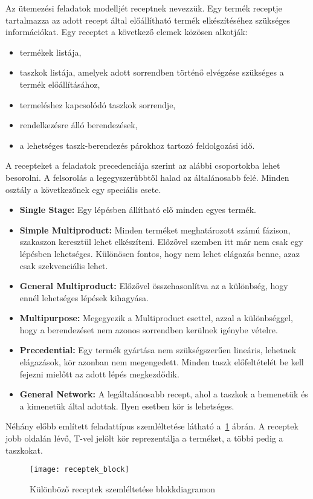 Az ütemezési feladatok modelljét receptnek nevezzük. Egy termék receptje tartalmazza az adott recept által előállítható termék elkészítéséhez szükséges információkat\cite{Hegyhati}. Egy receptet a következő elemek közösen alkotják:
\begin{itemize}
  \item termékek listája,
  \item taszkok listája, amelyek adott sorrendben történő elvégzése szükséges a termék előállításához,
  \item termeléshez kapcsolódó taszkok sorrendje,
  \item rendelkezésre álló berendezések,
  \item a lehetséges taszk-berendezés párokhoz tartozó feldolgozási idő.
\end{itemize}
A recepteket a feladatok precedenciája szerint az alábbi csoportokba lehet besorolni. A felsorolás a legegyszerűbbtől halad az általánosabb felé. Minden osztály a következőnek egy speciális esete.
\begin{itemize}
	\item \textbf{Single Stage:} Egy lépésben állítható elő minden egyes termék.
	\item \textbf{Simple Multiproduct:} Minden terméket meghatározott számú fázison, szakaszon keresztül lehet elkészíteni. Előzővel szemben itt már nem csak egy lépésben lehetséges. Különösen fontos, hogy nem lehet elágazás benne, azaz csak szekvenciális lehet.
	\item \textbf{General Multiproduct:} Előzővel összehasonlítva az a különbség, hogy ennél lehetséges lépések kihagyása.
	\item \textbf{Multipurpose:} Megegyezik a Multiproduct esettel, azzal a különbséggel, hogy a berendezéset nem azonos sorrendben kerülnek igénybe vételre.
	\item \textbf{Precedential:} Egy termék gyártása nem szükségszerűen lineáris, lehetnek elágazások, kör azonban nem megengedett. Minden taszk előfeltételét be kell fejezni mielőtt az adott lépés megkezdődik. 
	\item \textbf{General Network:} A legáltalánosabb recept, ahol a taszkok a bemenetük és a kimenetük által adottak. Ilyen esetben kör is lehetséges.
\end{itemize}
Néhány előbb említett feladattípus szemléltetése látható a~\ref{receptek_block} ábrán. A receptek jobb oldalán lévő, T-vel jelölt kör reprezentálja a terméket, a többi pedig a taszkokat.
\begin{figure}[H]	
\begin{center}
\texttt{[image: receptek\_block]}
\caption{Különböző receptek szemléltetése blokkdiagramon}
\label{receptek_block}
\end{center}
\end{figure}
